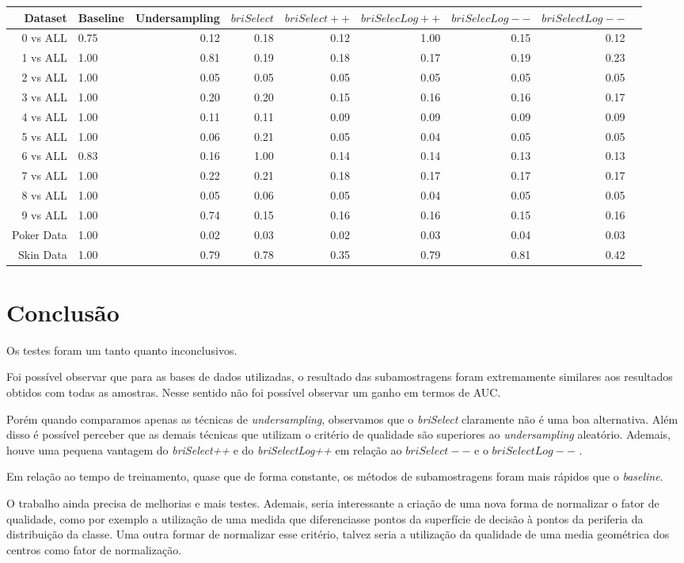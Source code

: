 \documentclass[]{article}
\begin{document}
	
	  	\begin{table}[H]
	  		\centering
	  		\tiny
	  		\begin{tabular}{rlrrrrrrr}
	  			\hline
	  			Dataset & Baseline & Undersampling & $briSelect$ & $briSelect++$ & $briSelecLog++$ & $briSelecLog--$& $briSelectLog--$ \\ 
  \hline
0 vs ALL & 0.75 & 0.12 & 0.18 & 0.12 & 1.00 & 0.15 & 0.12 \\ 
1 vs ALL & 1.00 & 0.81 & 0.19 & 0.18 & 0.17 & 0.19 & 0.23 \\ 
2 vs ALL & 1.00 & 0.05 & 0.05 & 0.05 & 0.05 & 0.05 & 0.05 \\ 
3 vs ALL & 1.00 & 0.20 & 0.20 & 0.15 & 0.16 & 0.16 & 0.17 \\ 
4 vs ALL & 1.00 & 0.11 & 0.11 & 0.09 & 0.09 & 0.09 & 0.09 \\ 
5 vs ALL & 1.00 & 0.06 & 0.21 & 0.05 & 0.04 & 0.05 & 0.05 \\ 
6 vs ALL & 0.83 & 0.16 & 1.00 & 0.14 & 0.14 & 0.13 & 0.13 \\ 
7 vs ALL & 1.00 & 0.22 & 0.21 & 0.18 & 0.17 & 0.17 & 0.17 \\ 
 8 vs ALL & 1.00 & 0.05 & 0.06 & 0.05 & 0.04 & 0.05 & 0.05 \\ 
 9 vs ALL & 1.00 & 0.74 & 0.15 & 0.16 & 0.16 & 0.15 & 0.16 \\ 
Poker Data & 1.00 & 0.02 & 0.03 & 0.02 & 0.03 & 0.04 & 0.03 \\ 
Skin Data & 1.00 & 0.79 & 0.78 & 0.35 & 0.79 & 0.81 & 0.42 \\ 
  \hline
\end{tabular}
\end{table}

\section{Conclusão}
Os testes foram um tanto quanto inconclusivos. 

Foi possível observar que para as bases de dados utilizadas, o resultado das subamostragens foram extremamente similares aos resultados obtidos com todas as amostras. Nesse sentido não foi possível observar um ganho em termos de AUC.

Porém quando comparamos apenas as técnicas de \textit{undersampling}, observamos que o \textit{briSelect} claramente não é uma boa alternativa. Além disso é possível perceber que as demais técnicas que utilizam o critério de qualidade são superiores ao \textit{undersampling} aleatório. Ademais, houve uma pequena vantagem do \textit{briSelect++} e do \textit{briSelectLog++} em relação ao \textit{$briSelect--$} e o \textit{$briSelectLog--$} .

Em relação ao tempo de treinamento, quase que de forma constante, os métodos de subamostragens foram mais rápidos que o \textit{baseline}.

O trabalho ainda precisa de melhorias e mais testes. Ademais, seria interessante a criação de uma nova forma de normalizar o fator de qualidade, como por exemplo a utilização de uma medida que diferenciasse pontos da superfície de decisão à pontos da periferia  da distribuição da classe. Uma outra formar de normalizar esse critério, talvez seria a utilização da qualidade de uma media geométrica dos centros como fator de normalização.
\end{document}
